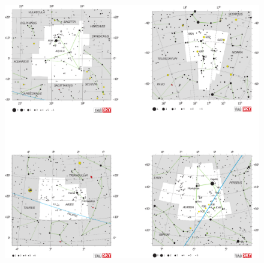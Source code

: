 \documentclass[a4paper,12pt]{extarticle}
\begin{document}
\begin{figure}
    \centering
    \includegraphics[width=\linewidth]{C2.eps}
\end{figure}
\end{document}
